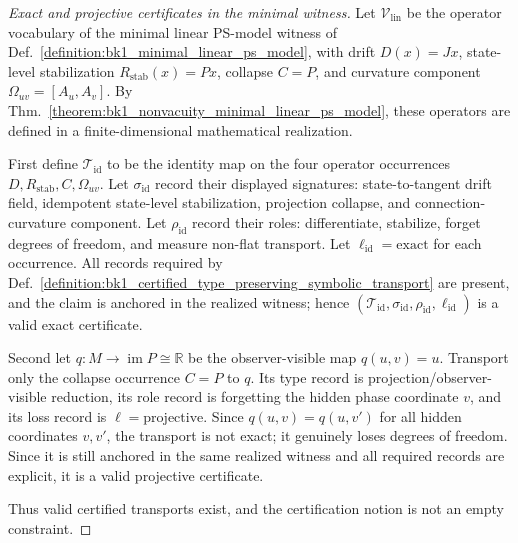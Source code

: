 \begin{proof}[Exact and projective certificates in the minimal witness]
\label{proof:bk1_nonvacuity_of_certified_transport}
\leavevmode
Let \(\mathcal{V}_{\mathrm{lin}}\) be the operator vocabulary of the minimal
linear PS-model witness of
Def.~\ref{definition:bk1_minimal_linear_ps_model}, with drift \(D(x)=Jx\),
state-level stabilization \(R_{\mathrm{stab}}(x)=Px\), collapse \(C=P\), and
curvature component \(\Omega_{uv}=[A_u,A_v]\).  By
Thm.~\ref{theorem:bk1_nonvacuity_minimal_linear_ps_model}, these operators are
defined in a finite-dimensional mathematical realization.

First define \(\mathcal{T}_{\mathrm{id}}\) to be the identity map on the four
operator occurrences \(D,R_{\mathrm{stab}},C,\Omega_{uv}\).  Let
\(\sigma_{\mathrm{id}}\) record their displayed signatures: state-to-tangent
drift field, idempotent state-level stabilization, projection collapse, and
connection-curvature component.  Let \(\rho_{\mathrm{id}}\) record their roles:
differentiate, stabilize, forget degrees of freedom, and measure non-flat
transport.  Let \(\ell_{\mathrm{id}}=\mathrm{exact}\) for each occurrence.  All
records required by
Def.~\ref{definition:bk1_certified_type_preserving_symbolic_transport} are
present, and the claim is anchored in the realized witness; hence
\((\mathcal{T}_{\mathrm{id}},\sigma_{\mathrm{id}},\rho_{\mathrm{id}},
\ell_{\mathrm{id}})\) is a valid exact certificate.

Second let \(q:M\to\operatorname{im}P\cong\mathbb{R}\) be the observer-visible
map \(q(u,v)=u\).  Transport only the collapse occurrence \(C=P\) to \(q\).
Its type record is projection/observer-visible reduction, its role record is
forgetting the hidden phase coordinate \(v\), and its loss record is
\(\ell=\mathrm{projective}\).  Since \(q(u,v)=q(u,v')\) for all hidden
coordinates \(v,v'\), the transport is not exact; it genuinely loses degrees of
freedom.  Since it is still anchored in the same realized witness and all
required records are explicit, it is a valid projective certificate.

Thus valid certified transports exist, and the certification notion is not an
empty constraint.
\end{proof}

